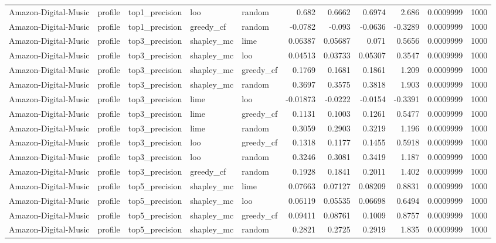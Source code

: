 \begin{table}[t]
\begin{tabular}{lllllrrrrrr}
Amazon-Digital-Music & profile & top1\_precision & loo & random & 0.682 & 0.6662 & 0.6974 & 2.686 & 0.0009999 & 1000 \\
Amazon-Digital-Music & profile & top1\_precision & greedy\_cf & random & -0.0782 & -0.093 & -0.0636 & -0.3289 & 0.0009999 & 1000 \\
Amazon-Digital-Music & profile & top3\_precision & shapley\_mc & lime & 0.06387 & 0.05687 & 0.071 & 0.5656 & 0.0009999 & 1000 \\
Amazon-Digital-Music & profile & top3\_precision & shapley\_mc & loo & 0.04513 & 0.03733 & 0.05307 & 0.3547 & 0.0009999 & 1000 \\
Amazon-Digital-Music & profile & top3\_precision & shapley\_mc & greedy\_cf & 0.1769 & 0.1681 & 0.1861 & 1.209 & 0.0009999 & 1000 \\
Amazon-Digital-Music & profile & top3\_precision & shapley\_mc & random & 0.3697 & 0.3575 & 0.3818 & 1.903 & 0.0009999 & 1000 \\
Amazon-Digital-Music & profile & top3\_precision & lime & loo & -0.01873 & -0.0222 & -0.0154 & -0.3391 & 0.0009999 & 1000 \\
Amazon-Digital-Music & profile & top3\_precision & lime & greedy\_cf & 0.1131 & 0.1003 & 0.1261 & 0.5477 & 0.0009999 & 1000 \\
Amazon-Digital-Music & profile & top3\_precision & lime & random & 0.3059 & 0.2903 & 0.3219 & 1.196 & 0.0009999 & 1000 \\
Amazon-Digital-Music & profile & top3\_precision & loo & greedy\_cf & 0.1318 & 0.1177 & 0.1455 & 0.5918 & 0.0009999 & 1000 \\
Amazon-Digital-Music & profile & top3\_precision & loo & random & 0.3246 & 0.3081 & 0.3419 & 1.187 & 0.0009999 & 1000 \\
Amazon-Digital-Music & profile & top3\_precision & greedy\_cf & random & 0.1928 & 0.1841 & 0.2011 & 1.402 & 0.0009999 & 1000 \\
Amazon-Digital-Music & profile & top5\_precision & shapley\_mc & lime & 0.07663 & 0.07127 & 0.08209 & 0.8831 & 0.0009999 & 1000 \\
Amazon-Digital-Music & profile & top5\_precision & shapley\_mc & loo & 0.06119 & 0.05535 & 0.06698 & 0.6494 & 0.0009999 & 1000 \\
Amazon-Digital-Music & profile & top5\_precision & shapley\_mc & greedy\_cf & 0.09411 & 0.08761 & 0.1009 & 0.8757 & 0.0009999 & 1000 \\
Amazon-Digital-Music & profile & top5\_precision & shapley\_mc & random & 0.2821 & 0.2725 & 0.2919 & 1.835 & 0.0009999 & 1000 \\

\end{tabular}
\end{table}
